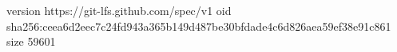 version https://git-lfs.github.com/spec/v1
oid sha256:ceea6d2eec7c24fd943a365b149d487be30bfdade4c6d826aea59ef38e91c861
size 59601
